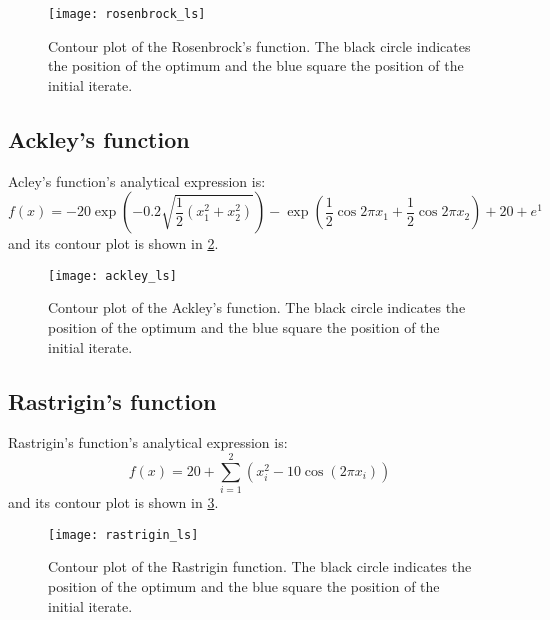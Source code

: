 {{{			\begin{figure}[h!]
				\begin{center}
					\texttt{[image: rosenbrock\_ls]}
					\caption[Contour plot of the Rosenbrock's function]{Contour plot of the Rosenbrock's function. The black circle indicates the position of the optimum and the blue square the position of the initial iterate.}
					\label{fig::rosenbrock}
				\end{center}
			\end{figure}
			
		}
		
		\subsection*{Ackley's function}
		{
			Acley's function's analytical expression is:
			\begin{equation}
				f(x) = -20\exp{\left(-0.2\sqrt{\frac{1}{2}(x_1^2+x_2^2)}\right)} - \exp{\left(\frac{1}{2}\cos{2\pi x_1} + \frac{1}{2}\cos{2\pi x_2}\right)} + 20 + e^1
			\end{equation}
			and its contour plot is shown in \ref{fig::ackley}.
			
			\begin{figure}[h!]
				\begin{center}
					\texttt{[image: ackley\_ls]}
					\caption[Contour plot of the Ackley's function]{Contour plot of the Ackley's function. The black circle indicates the position of the optimum and the blue square the position of the initial iterate.}
					\label{fig::ackley}
				\end{center}
			\end{figure}
		}
		
		\subsection*{Rastrigin's function}
		{
			Rastrigin's function's analytical expression is:
			\begin{equation}
				f(x) = 20 + \sum_{i=1}^2 (x_i^2 - 10\cos{(2\pi x_i)})
			\end{equation}
			and its contour plot is shown in \ref{fig::Rastrigin}.
			
			\begin{figure}[h!]
				\begin{center}
					\texttt{[image: rastrigin\_ls]}
					\caption[Contour plot of the Rastrigin function]{Contour plot of the Rastrigin function. The black circle indicates the position of the optimum and the blue square the position of the initial iterate.}
					\label{fig::Rastrigin}
				\end{center}
			\end{figure}
		}
		
}}

